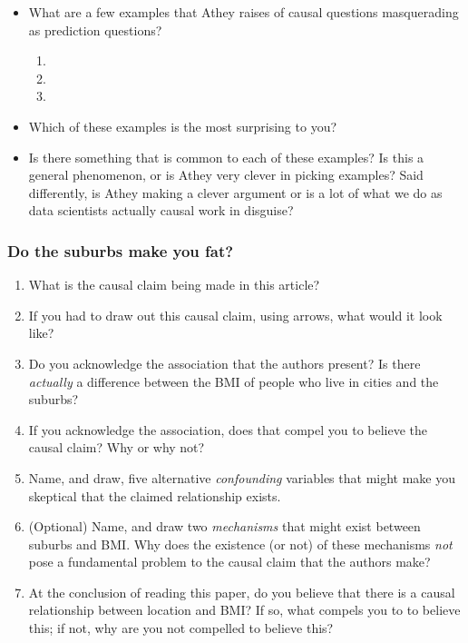 \documentclass[
]{article}
\providecommand{\tightlist}{%
  \setlength{\itemsep}{0pt}\setlength{\parskip}{0pt}}
\theoremstyle{definition}
\theoremstyle{definition}
\theoremstyle{definition}
\theoremstyle{definition}
\theoremstyle{remark}
\begin{document}
\begin{itemize}
\tightlist
\item
  What are a few examples that Athey raises of causal questions masquerading as prediction questions?

  \begin{enumerate}
  \def\labelenumi{\arabic{enumi}.}
  \tightlist
  \item
  \item
  \item
  \end{enumerate}
\item
  Which of these examples is the most surprising to you?
\item
  Is there something that is common to each of these examples? Is this a general phenomenon, or is Athey very clever in picking examples? Said differently, is Athey making a clever argument or is a lot of what we do as data scientists actually causal work in disguise?
\end{itemize}

\subsubsection{Do the suburbs make you fat?}\label{do-the-suburbs-make-you-fat}

\begin{enumerate}
\def\labelenumi{\arabic{enumi}.}
\tightlist
\item
  What is the causal claim being made in this article?
\item
  If you had to draw out this causal claim, using arrows, what would it look like?
\item
  Do you acknowledge the association that the authors present? Is there \emph{actually} a difference between the BMI of people who live in cities and the suburbs?
\item
  If you acknowledge the association, does that compel you to believe the causal claim? Why or why not?
\item
  Name, and draw, five alternative \emph{confounding} variables that might make you skeptical that the claimed relationship exists.
\item
  (Optional) Name, and draw two \emph{mechanisms} that might exist between suburbs and BMI. Why does the existence (or not) of these mechanisms \emph{not} pose a fundamental problem to the causal claim that the authors make?
\item
  At the conclusion of reading this paper, do you believe that there is a causal relationship between location and BMI? If so, what compels you to to believe this; if not, why are you not compelled to believe this?
\end{enumerate}
\end{document}

